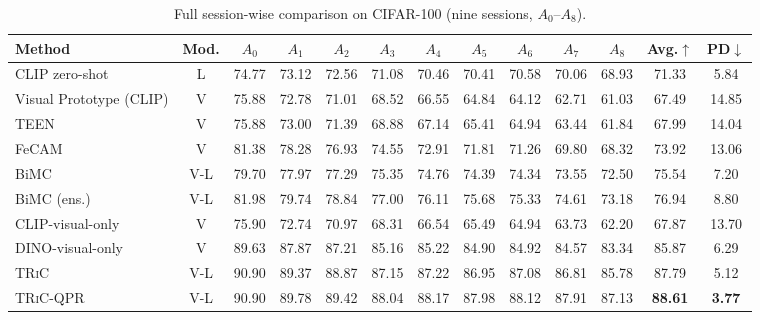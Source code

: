 \documentclass{iutbscthesis}
\begin{document}
\begin{table}[H]
    \centering
    \small
    \begin{tabular}{l c c c c c c c c c c c c}
        \toprule
        Method & Mod. & $A_0$ & $A_1$ & $A_2$ & $A_3$ & $A_4$ & $A_5$ & $A_6$ & $A_7$ & $A_8$ & Avg.$\uparrow$ & PD$\downarrow$ \\
        \midrule
        CLIP zero-shot & L & 74.77 & 73.12 & 72.56 & 71.08 & 70.46 & 70.41 & 70.58 & 70.06 & 68.93 & 71.33 & 5.84 \\
        Visual Prototype (CLIP) & V & 75.88 & 72.78 & 71.01 & 68.52 & 66.55 & 64.84 & 64.12 & 62.71 & 61.03 & 67.49 & 14.85 \\
        TEEN & V & 75.88 & 73.00 & 71.39 & 68.88 & 67.14 & 65.41 & 64.94 & 63.44 & 61.84 & 67.99 & 14.04 \\
        FeCAM & V & 81.38 & 78.28 & 76.93 & 74.55 & 72.91 & 71.81 & 71.26 & 69.80 & 68.32 & 73.92 & 13.06 \\
        BiMC & V-L & 79.70 & 77.97 & 77.29 & 75.35 & 74.76 & 74.39 & 74.34 & 73.55 & 72.50 & 75.54 & 7.20 \\
        BiMC (ens.) & V-L & 81.98 & 79.74 & 78.84 & 77.00 & 76.11 & 75.68 & 75.33 & 74.61 & 73.18 & 76.94 & 8.80 \\
        CLIP-visual-only & V & 75.90 & 72.74 & 70.97 & 68.31 & 66.54 & 65.49 & 64.94 & 63.73 & 62.20 & 67.87 & 13.70 \\
        DINO-visual-only & V & 89.63 & 87.87 & 87.21 & 85.16 & 85.22 & 84.90 & 84.92 & 84.57 & 83.34 & 85.87 & 6.29 \\
        \textsc{TRiC} & V-L & 90.90 & 89.37 & 88.87 & 87.15 & 87.22 & 86.95 & 87.08 & 86.81 & 85.78 & 87.79 & 5.12 \\
        \textsc{TRiC}-QPR & V-L & 90.90 & 89.78 & 89.42 & 88.04 & 88.17 & 87.98 & 88.12 & 87.91 & 87.13 & \textbf{88.61} & \textbf{3.77} \\
        \bottomrule
    \end{tabular}
    \caption{Full session-wise comparison on CIFAR-100 (nine sessions, $A_0$--$A_8$).}
    \label{tab:cifarsession}
\end{table}
\end{document}
